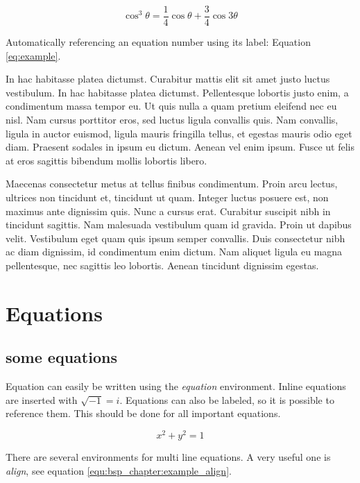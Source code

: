 \documentclass[
a4paper, %
10pt, %
unnumberedsections, %
twoside, %
]{LTJournalArticle}
\begin{document}
	\begin{equation}
		\cos^3 \theta =\frac{1}{4}\cos\theta+\frac{3}{4}\cos 3\theta
		\label{eq:example}
	\end{equation}
	
	Automatically referencing an equation number using its label: Equation \ref{eq:example}.
	
	In hac habitasse platea dictumst. Curabitur mattis elit sit amet justo luctus vestibulum. In hac habitasse platea dictumst. Pellentesque lobortis justo enim, a condimentum massa tempor eu. Ut quis nulla a quam pretium eleifend nec eu nisl. Nam cursus porttitor eros, sed luctus ligula convallis quis. Nam convallis, ligula in auctor euismod, ligula mauris fringilla tellus, et egestas mauris odio eget diam. Praesent sodales in ipsum eu dictum. Aenean vel enim ipsum. Fusce ut felis at eros sagittis bibendum mollis lobortis libero.
	
	Maecenas consectetur metus at tellus finibus condimentum. Proin arcu lectus, ultrices non tincidunt et, tincidunt ut quam. Integer luctus posuere est, non maximus ante dignissim quis. Nunc a cursus erat. Curabitur suscipit nibh in tincidunt sagittis. Nam malesuada vestibulum quam id gravida. Proin ut dapibus velit. Vestibulum eget quam quis ipsum semper convallis. Duis consectetur nibh ac diam dignissim, id condimentum enim dictum. Nam aliquet ligula eu magna pellentesque, nec sagittis leo lobortis. Aenean tincidunt dignissim egestas.
	
	
	\section{Equations}
	\subsection{some equations}
	Equation can easily be written using the \emph{equation}
	environment. Inline equations are inserted with $\sqrt{-1} = i $. Equations can
	also be labeled, so it is possible to reference them. This should be done for
	all important equations.
	
	\begin{equation}
		x^2 + y^2 = 1
		\label{equ:bsp_chapter:example_equation}
	\end{equation}
	
	There are several environments for multi line equations. A very useful one
	is \emph{align}, see equation \eqref{equ:bsp_chapter:example_align}.
	
\end{document}
